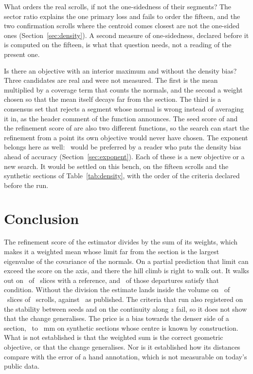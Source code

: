 What orders the real scrolls, if not the one-sidedness of their segments? The sector ratio
explains the one primary loss and fails to order the fifteen, and the two confirmation scrolls
where the centroid comes closest are not the one-sided ones (Section~\ref{sec:density}). A second
measure of one-sidedness, declared before it is computed on the fifteen, is what that question
needs, not a reading of the present one.

Is there an objective with an interior maximum and without the density bias? Three candidates are
real and were not measured. The first is the mean multiplied by a coverage term that counts the
normals, and the second a weight chosen so that the mean itself decays far from the section. The
third is a consensus set that rejects a segment whose normal is wrong instead of averaging it in,
as the header comment of the function announces. The
seed score of  and the refinement score of  are also two different
functions, so the search can start the refinement from a point its own objective would never have
chosen. The exponent belongs here as well: \RevExpLow\ would be preferred by a reader who puts the
density bias ahead of accuracy (Section~\ref{sec:exponent}). Each of these is a new objective or a
new search. It would be settled on this bench, on the fifteen scrolls and the synthetic sections of
Table~\ref{tab:density}, with the order of the criteria declared before the run.

\section{Conclusion}

The refinement score of the estimator divides by the sum of its weights, which makes it a weighted
mean whose limit far from the section is the largest eigenvalue of the covariance of the normals. On a partial
prediction that limit can exceed the score on the axis, and there the hill climb is right to walk
out. It walks out on \RevFarRunaways\ of \RevFarSlicesTotal\ slices with a reference, and
\RevFarTruePos\ of those departures satisfy that condition\RevFarMissClause. Without the division
the estimate lands inside the volume on \RevGenInsideFixed\ of \RevGenSlices\ slices of
\RevRunScrolls\ scrolls, against \RevGenInsideAsIs\ as published. The criteria that run also
registered on the stability between seeds and on the continuity along $z$ fail, so it does not
show that the change generalises. The price is a bias towards the
denser side of a section, \RevDensCircleOneSumFieldErrMm\ to \RevDensHalfSumFieldErrMm~mm on
synthetic sections whose centre is known by construction. What is not established is that the
weighted sum is the correct geometric objective, or that the change generalises. Nor is it
established how its distances compare with the error of a hand annotation, which is not measurable
on today's public data.

